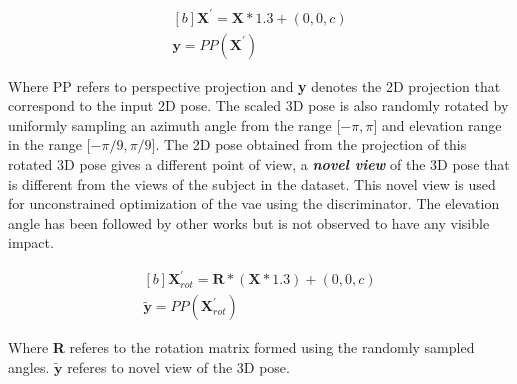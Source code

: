 \begin{equation} \label{eqn:proj_direct}
    \begin{gathered}[b]
        \textbf{X}^\prime = \textbf{X}*1.3 + (0,0,c) \\
        \textbf{y} = PP(\textbf{X}^\prime)
    \end{gathered}
\end{equation}

Where PP refers to perspective projection and \textbf{y} denotes the 2D projection that correspond to the input 2D pose. The scaled 3D pose is also randomly rotated by uniformly sampling an azimuth angle from the range [$-\pi, \pi$] and elevation range in the range [$-\pi/9, \pi/9$]. The 2D pose obtained from the projection of this rotated 3D pose gives a different point of view, a \textbf{\textit{novel view}} of the 3D pose that is different from the views of the subject in the dataset. This novel view is used for unconstrained optimization of the \ac{vae} using the discriminator. The elevation angle has been followed by other works but is not observed to have any visible impact.

\begin{equation} \label{eqn:proj_rotated}
    \begin{gathered}[b]
        \textbf{X}^\prime_{rot} = \textbf{R} * (\textbf{X}*1.3) + (0,0,c) \\
        \tilde{\textbf{y}} = PP(\textbf{X}^\prime_{rot})
    \end{gathered}
\end{equation}

Where \textbf{R} referes to the rotation matrix formed using the randomly sampled angles. $\tilde{\textbf{y}}$ referes to novel view of the 3D pose.

